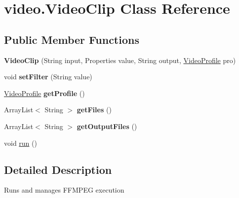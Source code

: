 \hypertarget{classvideo_1_1_video_clip}{
\section{video.VideoClip Class Reference}
\label{classvideo_1_1_video_clip}
}
\subsection*{Public Member Functions}
\begin{DoxyCompactItemize}
\item 
\hypertarget{classvideo_1_1_video_clip_af86707967ac07f4362908d37bef33d69}{
{\bfseries VideoClip} (String input, Properties value, String output, \hyperlink{classvideo_1_1_video_profile}{VideoProfile} pro)}
\label{classvideo_1_1_video_clip_af86707967ac07f4362908d37bef33d69}

\item 
\hypertarget{classvideo_1_1_video_clip_a2c5f4f33dd9f104f2c1a65111fe8d04c}{
void {\bfseries setFilter} (String value)}
\label{classvideo_1_1_video_clip_a2c5f4f33dd9f104f2c1a65111fe8d04c}

\item 
\hypertarget{classvideo_1_1_video_clip_ad2e8fe4c67eb2e1b545fece12a745cb8}{
\hyperlink{classvideo_1_1_video_profile}{VideoProfile} {\bfseries getProfile} ()}
\label{classvideo_1_1_video_clip_ad2e8fe4c67eb2e1b545fece12a745cb8}

\item 
\hypertarget{classvideo_1_1_video_clip_a6e22c3a56e9603452a2c721af287ed07}{
ArrayList$<$ String $>$ {\bfseries getFiles} ()}
\label{classvideo_1_1_video_clip_a6e22c3a56e9603452a2c721af287ed07}

\item 
\hypertarget{classvideo_1_1_video_clip_ad3919b7bd7ec888f71cf309ad1f3f06a}{
ArrayList$<$ String $>$ {\bfseries getOutputFiles} ()}
\label{classvideo_1_1_video_clip_ad3919b7bd7ec888f71cf309ad1f3f06a}

\item 
void \hyperlink{classvideo_1_1_video_clip_a3d5847a20be26fb0be1891bb8ebf30a3}{run} ()
\end{DoxyCompactItemize}


\subsection{Detailed Description}
Runs and manages FFMPEG execution 

